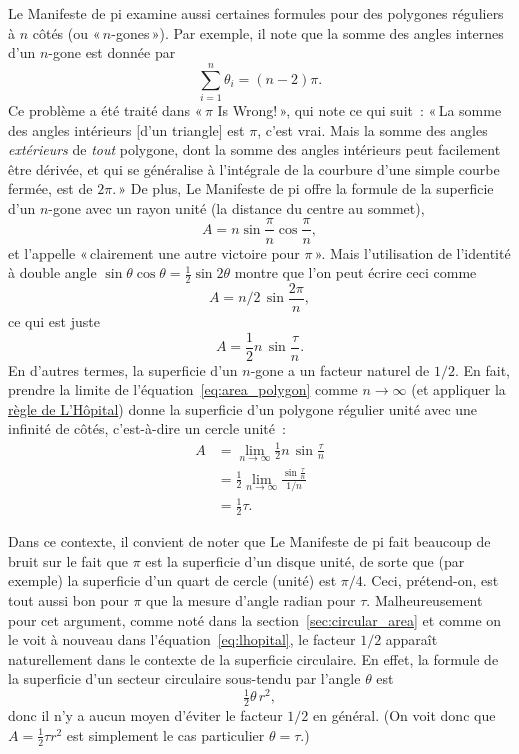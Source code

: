 Le Manifeste de pi examine aussi certaines formules pour des polygones réguliers
à $n$ côtés (ou «\,$n$-gones\,»). Par exemple, il note que la somme des angles
internes d'un $n$-gone est donnée par
\[
\sum_{i=1}^n \theta_i=(n-2)\pi.
\]
Ce problème a été traité dans «\,$\pi$ Is Wrong!\,», qui note ce qui suit~:
«\,La somme des angles intérieurs [d'un triangle] est $\pi$, c'est vrai. Mais la
somme des angles \emph{extérieurs} de \emph{tout} polygone, dont la somme des
angles intérieurs peut facilement être dérivée, et qui se généralise à
l'intégrale de la courbure d'une simple courbe fermée, est de $2\pi$.\,» De
plus, Le Manifeste de pi offre la formule de la superficie d'un $n$-gone avec un
rayon unité (la distance du centre au sommet),
\[ A=n\sin\frac{\pi}{n}\cos\frac{\pi}{n}, \]
et l'appelle «\,clairement\textellipsis{} une autre victoire pour $\pi$\,». Mais
l'utilisation de l'identité à double angle $\sin\theta\cos\theta =
\frac{1}{2}\sin2\theta$ montre que l'on peut écrire ceci comme
\[ A = n/2\, \sin\frac{2\pi}{n}, \]
ce qui est juste
\begin{equation}
\label{eq:area_polygon}
A = \frac{1}{2} n\, \sin\frac{\tau}{n}.
\end{equation}
En d'autres termes, la superficie d'un $n$-gone a un facteur
naturel de $1/2$. En fait, prendre la limite de
l'équation~\eqref{eq:area_polygon} comme $n\rightarrow \infty$ (et appliquer la
\href{https://fr.wikipedia.org/wiki/R%C3%A8gle_de_L%27H%C3%B4pital}{règle de
L'Hôpital}) donne la superficie d'un polygone régulier unité avec une infinité
de côtés, c'est-à-dire un cercle unité~:
\begin{equation}
\label{eq:lhopital}
\begin{split}
A & = \lim_{n\rightarrow\infty} \frac{1}{2} n\, \sin\frac{\tau}{n} \\
  & = \frac{1}{2} \lim_{n\rightarrow\infty} \frac{\sin\frac{\tau}{n}}{1/n} \\
  & = \tfrac{1}{2}\tau.
\end{split}
\end{equation}

Dans ce contexte, il convient de noter que Le Manifeste de pi fait beaucoup de
bruit sur le fait que $\pi$ est la superficie d'un disque unité, de sorte que
(par exemple) la superficie d'un quart de cercle (unité) est $\pi/4$. Ceci,
prétend-on, est tout aussi bon pour $\pi$ que la mesure d'angle radian pour
$\tau$. Malheureusement pour cet argument, comme noté dans la
section~\ref{sec:circular_area} et comme on le voit à nouveau dans
l'équation~\eqref{eq:lhopital}, le facteur $1/2$ apparaît naturellement dans le
contexte de la superficie circulaire. En effet, la formule de la superficie d'un
secteur circulaire sous-tendu par l'angle $\theta$ est
\[
\tfrac{1}{2}\theta\, r^2,
\]
donc il n'y a aucun moyen d'éviter le facteur $1/2$ en général. (On voit donc
que $A = \frac{1}{2}\tau r^2$ est simplement le cas particulier $\theta =
\tau$.)


